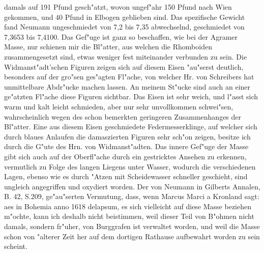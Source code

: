 \documentclass[a4paper, 11pt, oneside, polutonikogreek, german]{article}
\begin{document}
damals auf 191 Pfund gesch"atzt, wovon ungef"ahr 150 Pfund nach Wien gekommen, und 40 Pfund in Elbogen geblieben sind. Das spezifische Gewicht fand Neumann ungeschmiedet von 7,2 bis 7,35 abwechselnd, geschmiedet von 7,3653 bis 7,4100. Das Gef"uge ist ganz so beschaffen, wie bei der Agramer Masse, nur schienen mir die Bl"atter, aus welchen die Rhomboiden zusammengesetzt sind, etwas weniger fest miteinander verbunden zu sein. Die Widmanst"adt'schen Figuren zeigen sich auf diesem Eisen "au"serst deutlich, besonders auf der gro"sen ges"agten Fl"ache, von welcher Hr. von Schreibers hat unmittelbare Abdr"ucke machen lassen. An meinem St"ucke sind auch an einer ge"atzten Fl"ache diese Figuren sichtbar. Das Eisen ist sehr weich, und l"asst sich warm und kalt leicht schmieden, aber nur sehr unvollkommen schwei"sen, wahrscheinlich wegen des schon bemerkten geringeren Zusammenhanges der Bl"atter. Eine aus diesem Eisen geschmiedete Federmesserklinge, auf welcher sich durch blaues Anlaufen die damaszierten Figuren sehr sch"on zeigen, besitze ich durch die G"ute des Hrn. von Widmanst"adten. Das innere Gef"uge der Masse gibt sich auch auf der Oberfl"ache durch ein gestricktes Ansehen zu erkennen, vermutlich zu Folge des langen Liegens unter Wasser, wodurch die verschiedenen Lagen, ebenso wie es durch "Atzen mit Scheidewasser schneller geschieht, sind ungleich angegriffen und oxydiert worden. Der von Neumann in Gilberts Annalen, B. 42, S.209, ge"au"serten Vermutung, dass, wenn Marcus Marci a Kronland sagt: aes in Bohemia anno 1618 delapsum, es sich vielleicht auf diese Masse beziehen m"ochte, kann ich deshalb nicht beistimmen, weil dieser Teil von B"ohmen nicht damals, sondern fr"uher, von Burggrafen ist verwaltet worden, und weil die Masse schon von "alterer Zeit her auf dem dortigen Rathause aufbewahrt worden zu sein scheint.
\end{document}
